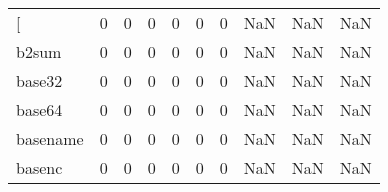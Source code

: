 \begin{longtable}{lrrrrrrrrr}
\bottomrule
\endlastfoot
{[}         &                                       0 &                                                  0 &                                                  0 &                                                  0 &                                                  0 &                                                  0 &                                                NaN &                                    NaN &                                  NaN \\
b2sum     &                                       0 &                                                  0 &                                                  0 &                                                  0 &                                                  0 &                                                  0 &                                                NaN &                                    NaN &                                  NaN \\
base32    &                                       0 &                                                  0 &                                                  0 &                                                  0 &                                                  0 &                                                  0 &                                                NaN &                                    NaN &                                  NaN \\
base64    &                                       0 &                                                  0 &                                                  0 &                                                  0 &                                                  0 &                                                  0 &                                                NaN &                                    NaN &                                  NaN \\
basename  &                                       0 &                                                  0 &                                                  0 &                                                  0 &                                                  0 &                                                  0 &                                                NaN &                                    NaN &                                  NaN \\
basenc    &                                       0 &                                                  0 &                                                  0 &                                                  0 &                                                  0 &                                                  0 &                                                NaN &                                    NaN &                                  NaN \\

\end{longtable}
